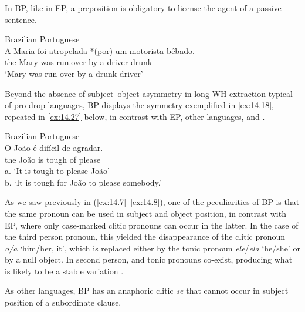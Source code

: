 \documentclass[output=paper]{langsci/langscibook}
\begin{document}

In \gls{BP}, like in \gls{EP}, a preposition is obligatory to license the
agent of a passive sentence.

\ea\label{ex:14.26}Brazilian Portuguese\\
    \gll    A Maria foi atropelada *(por) um motorista bêbado.\\
            the Mary was run.over \hphantom{*(}by a driver drunk\\
    \glt    ‘Mary was run over by a drunk driver’\\
\z


Beyond the absence of subject--object asymmetry in long
WH-extraction typical
of pro-drop languages, \gls{BP} displays the symmetry exemplified in
\eqref{ex:14.18}, repeated in \eqref{ex:14.27} below, in contrast with \gls{EP},
other  languages, and .

\ea%
    \label{ex:14.27}Brazilian Portuguese\\
    \gll    O João é difícil de agradar.\\
            the João is tough of please\\
	\glt    a. ‘It is tough to please João’\\
            b. ‘It is tough for João to please somebody.’
\z


As we saw previously in (\ref{ex:14.7}--\ref{ex:14.8}), one of the
peculiarities of \gls{BP} is that the same pronoun can be used in subject and
object position, in contrast with \gls{EP}, where only case-marked clitic
pronouns can occur in the latter. In the case of the third person pronoun, this
yielded the disappearance of the clitic pronoun \emph{o/a} ‘him/her, it’, which
is replaced either by the tonic pronoun \emph{ele}/\emph{ela} ‘he/she’ or by a
null object. In second person,  and tonic pronouns co-exist, producing
what is likely to be a stable variation \citep{Galves2019}.


As other  languages, \gls{BP} has an anaphoric clitic \emph{se} that
cannot occur in subject position of a subordinate clause.
\end{document}

